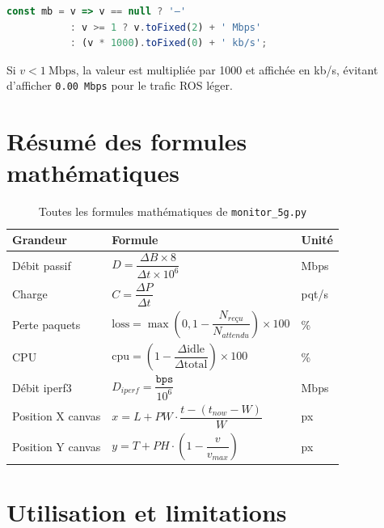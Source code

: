 \documentclass[a4paper,12pt]{article}
\begin{document}
\begin{lstlisting}[language=JavaScript, caption={Auto-scaling JS}]
const mb = v => v == null ? '—'
           : v >= 1 ? v.toFixed(2) + ' Mbps'
           : (v * 1000).toFixed(0) + ' kb/s';
\end{lstlisting}

Si $v < 1\ \text{Mbps}$, la valeur est multipliée par 1000 et affichée en kb/s,
évitant d'afficher \texttt{0.00 Mbps} pour le trafic ROS léger.

\section{Résumé des formules mathématiques}

\begin{table}[H]
\centering
\begin{tabular}{p{4cm}p{7cm}l}
\toprule
\textbf{Grandeur} & \textbf{Formule} & \textbf{Unité} \\
\midrule
Débit passif &
$D = \dfrac{\Delta B \times 8}{\Delta t \times 10^6}$ &
Mbps \\[10pt]
Charge &
$C = \dfrac{\Delta P}{\Delta t}$ &
pqt/s \\[10pt]
Perte paquets &
$\text{loss} = \max\!\left(0, 1 - \dfrac{N_{reçu}}{N_{attendu}}\right) \times 100$ &
\% \\[10pt]
CPU &
$\text{cpu} = \left(1 - \dfrac{\Delta\text{idle}}{\Delta\text{total}}\right) \times 100$ &
\% \\[10pt]
Débit iperf3 &
$D_{iperf} = \dfrac{\texttt{bps}}{10^6}$ &
Mbps \\[10pt]
Position X canvas &
$x = L + PW \cdot \dfrac{t - (t_{now}-W)}{W}$ &
px \\[10pt]
Position Y canvas &
$y = T + PH \cdot \left(1 - \dfrac{v}{v_{max}}\right)$ &
px \\
\bottomrule
\end{tabular}
\caption{Toutes les formules mathématiques de \texttt{monitor\_5g.py}}
\end{table}

\section{Utilisation et limitations}
\end{document}
